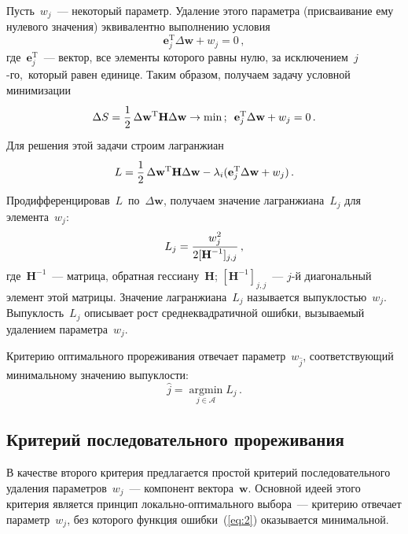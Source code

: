 \begin{multicols}{2}
Пусть~$w_j$~--- некоторый параметр. Удаление этого параметра
(присваивание ему нулевого значения) эквивалентно выполнению условия
\begin{equation*}
\mathbf{e}_j^{\mathrm{T}} \Delta \mathbf{w} + w_j = 0\,,
\end{equation*}
где~$\mathbf{e}_j^{\mathrm{T}}$~--- вектор, все элементы
которого равны нулю, за исключением~$j$-го,~который равен единице.
Таким образом, получаем задачу условной минимизации
\begin{equation*}
\Delta S = \displaystyle\frac{\displaystyle 1\mathstrut}{\displaystyle 2\mathstrut}\,\Delta \mathbf{w}^{\mathrm{T}}\mathbf{H}\Delta\mathbf{w}
\rightarrow \min\,;\enskip \mathbf{e}_j^{\mathrm{T}} \Delta \mathbf{w} + w_j = 0\,.
\end{equation*}
Для решения этой задачи строим лагранжиан
\begin{equation*}
L = \displaystyle\frac{\displaystyle 1\mathstrut}{\displaystyle 2\mathstrut}\,\Delta \mathbf{w}^{\mathrm{T}}\mathbf{H}\Delta \mathbf{w} -
\lambda_i(\mathbf{e}_j^{\mathrm{T}} \Delta \mathbf{w} + w_j)\,.
\end{equation*}
Продифференцировав~$L$~по~$\Delta \mathbf{w}$, получаем значение
лагранжиана~$L_j$ для элемента~$w_j$:
\begin{equation*}
L_j = \displaystyle\frac{\displaystyle w_j^2\mathstrut}{\displaystyle 2[\mathbf{H}^{-1}]_{j,j}\mathstrut}\,,
\end{equation*}
где~$\mathbf{H}^{-1}$~--- матрица, обратная
гессиану~$\mathbf{H}$; $[\mathbf{H}^{-1}]_{j,j}$~--- $j$-й диагональный элемент
этой матрицы. Значение лагранжиана~$L_j$ называется выпуклостью~$w_j$.
Выпуклость~$L_j$ описывает рост среднеквадратичной ошибки, вызываемый удалением
параметра~$w_j$.

Критерию оптимального прореживания отвечает параметр~$w_{\hat{j}}$,
соответствующий минимальному значению выпуклости:
\begin{equation}
\label{eq:6}
\hat{j} = \mathop{\arg\min}\limits_{{j \in \mathcal{A}}}L_j\,.
\end{equation}

\subsection{Критерий последовательного прореживания}

В качестве второго критерия предлагается прос\-той критерий последовательного
удаления па\-ра\-мет\-ров~$w_j$~--- компонент вектора~$\mathbf{w}$. Основной идеей
этого критерия является принцип ло\-каль\-но-опти\-маль\-но\-го выбора~---
критерию отвечает параметр~$w_j$, без которого функция ошибки~(\ref{eq:2})
оказывается минимальной.


\end{multicols}
